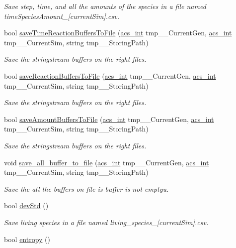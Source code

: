 \begin{DoxyCompactItemize}
\begin{DoxyCompactList}\small\item\em Save step, time, and all the amounts of the species in a file named time\-Species\-Amount\-\_\-\mbox{[}current\-Sim\mbox{]}.csv. \end{DoxyCompactList}\item 
bool \hyperlink{a00003_af36d51ba1965d3f23c879c0d0fb69026}{save\-Time\-Reaction\-Buffers\-To\-File} (\hyperlink{a00016_a8d277355641a098190360234e2ebde35}{acs\-\_\-int} tmp\-\_\-\-\_\-\-Current\-Gen, \hyperlink{a00016_a8d277355641a098190360234e2ebde35}{acs\-\_\-int} tmp\-\_\-\-\_\-\-Current\-Sim, string tmp\-\_\-\-\_\-\-Storing\-Path)
\begin{DoxyCompactList}\small\item\em Save the stringstream buffers on the right files. \end{DoxyCompactList}\item 
bool \hyperlink{a00003_ad88fbfd83b7713baf3b528d9a3675540}{save\-Reaction\-Buffers\-To\-File} (\hyperlink{a00016_a8d277355641a098190360234e2ebde35}{acs\-\_\-int} tmp\-\_\-\-\_\-\-Current\-Gen, \hyperlink{a00016_a8d277355641a098190360234e2ebde35}{acs\-\_\-int} tmp\-\_\-\-\_\-\-Current\-Sim, string tmp\-\_\-\-\_\-\-Storing\-Path)
\begin{DoxyCompactList}\small\item\em Save the stringstream buffers on the right files. \end{DoxyCompactList}\item 
bool \hyperlink{a00003_a3a7c8819ab4e81a3e2f18d193ba9176f}{save\-Amount\-Buffers\-To\-File} (\hyperlink{a00016_a8d277355641a098190360234e2ebde35}{acs\-\_\-int} tmp\-\_\-\-\_\-\-Current\-Gen, \hyperlink{a00016_a8d277355641a098190360234e2ebde35}{acs\-\_\-int} tmp\-\_\-\-\_\-\-Current\-Sim, string tmp\-\_\-\-\_\-\-Storing\-Path)
\begin{DoxyCompactList}\small\item\em Save the stringstream buffers on the right files. \end{DoxyCompactList}\item 
void \hyperlink{a00003_ac8b2bc669994dd3850769f4835dd40a2}{save\-\_\-all\-\_\-buffer\-\_\-to\-\_\-file} (\hyperlink{a00016_a8d277355641a098190360234e2ebde35}{acs\-\_\-int} tmp\-\_\-\-\_\-\-Current\-Gen, \hyperlink{a00016_a8d277355641a098190360234e2ebde35}{acs\-\_\-int} tmp\-\_\-\-\_\-\-Current\-Sim, string tmp\-\_\-\-\_\-\-Storing\-Path)
\begin{DoxyCompactList}\small\item\em Save the all the buffers on file is buffer is not emptyu. \end{DoxyCompactList}\item 
bool \hyperlink{a00003_ae7fd21d14f81c4854b3a6163b0278857}{dev\-Std} ()
\begin{DoxyCompactList}\small\item\em Save living species in a file named living\-\_\-species\-\_\-\mbox{[}current\-Sim\mbox{]}.csv. \end{DoxyCompactList}\item 
bool \hyperlink{a00003_a4e9b60ec8b05e888cf0e55def03ee906}{entropy} ()
\end{DoxyCompactItemize}


